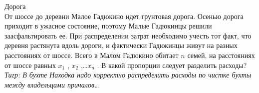 \begin{problem}
 Дорога\\
От шоссе до деревни Малое Гадюкино идет грунтовая дорога. Осенью дорога приходит в ужасное состояние, поэтому Малые Гадюкинцы решили заасфальтировать ее. При распределении затрат необходимо учесть тот факт, что деревня растянута вдоль дороги, и фактически Гадюкинцы живут на разных расстояниях от шоссе. Всего в Малом Гадюкино обитает  $n$  семей, на расстояниях от шоссе равных  $x_{1} $ ,  $x_{2} $ ,\ldots  $x_{n} $ .
В какой пропорции следует разделить расходы?\\
{\it Тигр:  В бухте Находка надо корректно распределить расходы по чистке бухты между владельцами причалов\ldots }




\begin{sol}

\end{sol}
\end{problem}



